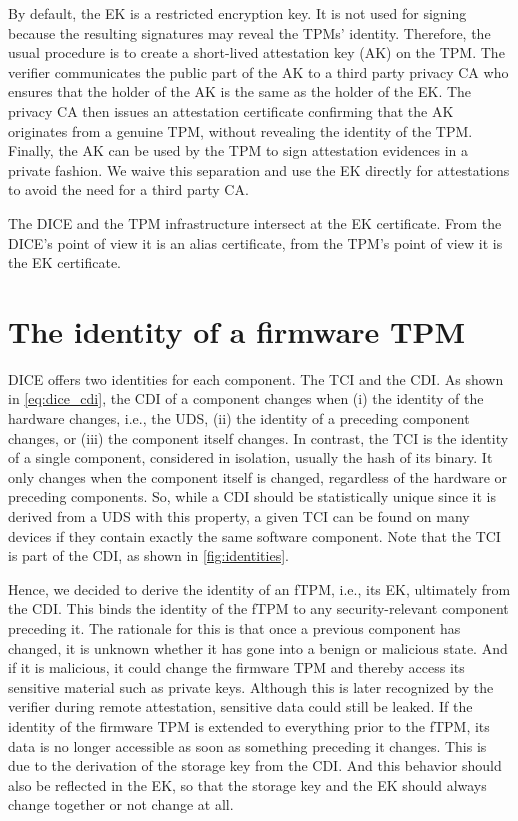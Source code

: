 
By default, the EK is a restricted encryption key.
It is not used for signing because the resulting signatures may reveal the TPMs' identity.
Therefore, the usual procedure is to create a short-lived attestation key (AK) on the TPM.
The verifier communicates the public part of the AK to a third party privacy CA who ensures that the holder of the AK is the same as the holder of the EK.
The privacy CA then issues an attestation certificate confirming that the AK originates from a genuine TPM, without revealing the identity of the TPM.
Finally, the AK can be used by the TPM to sign attestation evidences in a private fashion.
We waive this separation and use the EK directly for attestations to avoid the need for a third party CA.


The DICE and the TPM infrastructure intersect at the EK certificate.
From the DICE's point of view it is an alias certificate, from the TPM's point of view it is the EK certificate.

\section{The identity of a firmware TPM}

DICE offers two identities for each component.
The TCI and the CDI.
As shown in \autoref{eq:dice_cdi}, the CDI of a component changes when (i) the identity of the hardware changes, i.e., the UDS, (ii) the identity of a preceding component changes, or (iii) the component itself changes.
In contrast, the TCI is the identity of a single component, considered in isolation, usually the hash of its binary.
It only changes when the component itself is changed, regardless of the hardware or preceding components.
So, while a CDI should be statistically unique since it is derived from a UDS with this property, a given TCI can be found on many devices if they contain exactly the same software component.
Note that the TCI is part of the CDI, as shown in \autoref{fig:identities}.



Hence, we decided to derive the identity of an fTPM, i.e., its EK, ultimately from the CDI.
This binds the identity of the fTPM to any security-relevant component preceding it.
The rationale for this is that once a previous component has changed, it is unknown whether it has gone into a benign or malicious state.
And if it is malicious, it could change the firmware TPM and thereby access its sensitive material such as private keys.
Although this is later recognized by the verifier during remote attestation, sensitive data could still be leaked.
If the identity of the firmware TPM is extended to everything prior to the fTPM, its data is no longer accessible as soon as something preceding it changes.
This is due to the derivation of the storage key from the CDI.
And this behavior should also be reflected in the EK, so that the storage key and the EK should always change together or not change at all.

